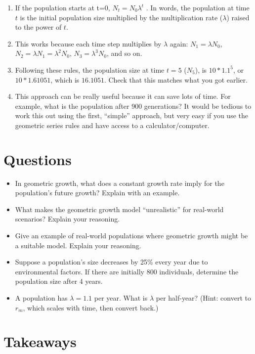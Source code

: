 \documentclass[
  a4paper]{book}
\providecommand{\tightlist}{%
  \setlength{\itemsep}{0pt}\setlength{\parskip}{0pt}}
\begin{document}
\begin{enumerate}
\def\labelenumi{\arabic{enumi}.}
\tightlist
\item
  If the population starts at t=0, \(N_t = N_0 \lambda^t\) . In words, the population at time \(t\) is the initial population size multiplied by the multiplication rate (\(\lambda\)) raised to the power of \(t\).
\item
  This works because each time step multiplies by \(\lambda\) again: \(N_1 = \lambda N_0\), \(N_2 = \lambda N_1 = \lambda^2 N_0\), \(N_3 = \lambda^3 N_0\), and so on.
\item
  Following these rules, the population size at time \(t=5\) (\(N_5\)), is \(10 * 1.1^5\), or \(10* 1.61051\), which is \(16.1051\). Check that this matches what you got earlier.
\item
  This approach can be really useful because it can save lots of time. For example, what is the population after 900 generations? It would be tedious to work this out using the first, ``simple'' approach, but very easy if you use the geometric series rules and have access to a calculator/computer.
\end{enumerate}

\section{Questions}\label{questions-2}

\begin{itemize}
\tightlist
\item
  In geometric growth, what does a constant growth rate imply for the population's future growth? Explain with an example.
\item
  What makes the geometric growth model ``unrealistic'' for real-world scenarios? Explain your reasoning.
\item
  Give an example of real-world populations where geometric growth might be a suitable model. Explain your reasoning.
\item
  Suppose a population's size decreases by 25\% every year due to environmental factors. If there are initially 800 individuals, determine the population size after 4 years.
\item
  A population has \(\lambda = 1.1\) per year. What is \(\lambda\) per half-year? (Hint: convert to \(r_m\), which scales with time, then convert back.)
\end{itemize}

\section{Takeaways}\label{takeaways-2}
\end{document}
